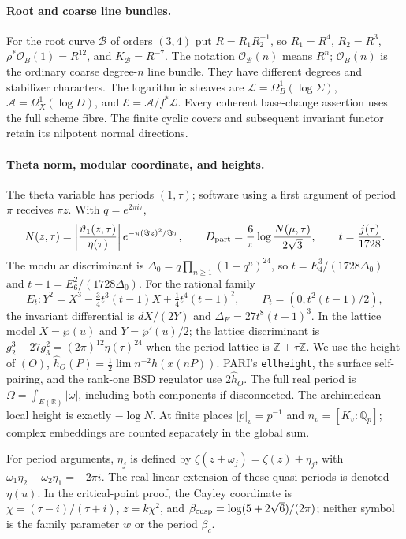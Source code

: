 \paragraph{Root and coarse line bundles.}
For the root curve $\mathcal B$ of orders $(3,4)$ put
$R=R_1R_2^{-1}$, so
$R_1=R^4$, $R_2=R^3$, $\rho^*\mathcal O_B(1)=R^{12}$,
and $K_{\mathcal B}=R^{-7}$.
The notation $\mathcal O_{\mathcal B}(n)$ means $R^n$;
$\mathcal O_B(n)$ is the ordinary coarse degree-$n$ line bundle.
They have different degrees and stabilizer characters.
The logarithmic sheaves are
$\mathcal L=\Omega_B^1(\log\Sigma)$,
$\mathcal A=\Omega_X^1(\log D)$, and
$\mathcal E=\mathcal A/f^*\mathcal L$.
Every coherent base-change assertion uses the full scheme fibre.
The finite cyclic covers and subsequent invariant functor retain its
nilpotent normal directions.

\paragraph{Theta norm, modular coordinate, and heights.}
The theta variable has periods $(1,\tau)$; software using a first
argument of period $\pi$ receives $\pi z$. With $q=e^{2\pi i\tau}$,
\[
 N(z,\tau)=\left|\frac{\vartheta_1(z,\tau)}{\eta(\tau)}\right|
       e^{-\pi(\Im z)^2/\Im\tau},\qquad
 D_{\rm part}=\frac6\pi\log\frac{N(\mu,\tau)}{2\sqrt3},
 \qquad t=\frac{j(\tau)}{1728}.
\]
The modular discriminant is
$\Delta_0=q\prod_{n\ge1}(1-q^n)^{24}$, so
$t=E_4^3/(1728\Delta_0)$ and $t-1=E_6^2/(1728\Delta_0)$.
For the rational family
\[
 E_t:Y^2=X^3-\tfrac34t^3(t-1)X+\tfrac14t^4(t-1)^2,
 \qquad P_t=(0,t^2(t-1)/2),
\]
the invariant differential is $dX/(2Y)$ and
$\Delta_E=27t^8(t-1)^3$.
In the lattice model $X=\wp(u)$ and $Y=\wp'(u)/2$;
the lattice discriminant is
$g_2^3-27g_3^2=(2\pi)^{12}\eta(\tau)^{24}$ when the
period lattice is $\mathbb Z+\tau\mathbb Z$.
We use the height of $(O)$,
$\widehat h_O(P)=\frac12\lim n^{-2}h(x(nP))$.
PARI's \texttt{ellheight}, the surface self-pairing, and the
rank-one BSD regulator use $2\widehat h_O$.
The full real period is $\Omega=\int_{E(\mathbb R)}|\omega|$,
including both components if disconnected.
The archimedean local height is exactly $-\log N$.
At finite places $|p|_v=p^{-1}$ and $n_v=[K_v:\mathbb Q_p]$;
complex embeddings are counted separately in the global sum.

For period arguments, $\eta_j$ is defined by
$\zeta(z+\omega_j)=\zeta(z)+\eta_j$, with
$\omega_1\eta_2-\omega_2\eta_1=-2\pi i$.
The real-linear extension of these quasi-periods is denoted $\eta(u)$.
In the critical-point proof, the Cayley coordinate is
$\chi=(\tau-i)/(\tau+i)$, $z=k\chi^2$, and
$\beta_{\rm cusp}=\log(5+2\sqrt6)/(2\pi)$;
neither symbol is the family parameter $w$ or the period $\beta_c$.

